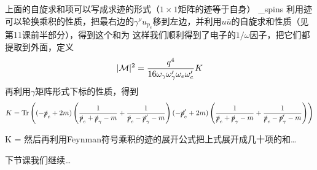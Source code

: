 \documentclass[CJK]{beamer}
\begin{document}
\begin{frame}
\bch
上面的自旋求和项可以写成求迹的形式（$1\times 1$矩阵的迹等于自身）
{\tiny
\be
\sum_{\rm spins}  
\ee
}
利用迹可以轮换乘积的性质，把最右边的$\gamma^\nu u_{p_e}$移到左边，并利用$u\bar{u}$的自旋求和性质（见第11课前半部分），得到这个和为
{\tiny
\bea
\eea
}
这样我们顺利得到了电子的$1/\omega$因子，把它们都提取到外面，定义
{\scriptsize 
$$|{\mathcal{M}}|^2 = \frac{q^4}{16 \omega_\gamma\omega_\gamma'\omega_e\omega_e'} K$$}
再利用$\gamma$矩阵形式下标的性质，得到
{\tiny
$$K =  \mathrm{Tr}\left((-\slashed{p}_e+2m) \left(\frac{1}{\slashed{p}_e+\slashed{p}_\gamma-m}+\frac{1}{\slashed{p}_e-\slashed{p}_\gamma'-m}\right)(-\slashed{p}_e'+2m)\left(\frac{1}{\slashed{p}_e+\slashed{p}_\gamma-m}+\frac{1}{\slashed{p}_e-\slashed{p}_\gamma'-m}\right)\right)$$
}

\ech
\end{frame}

\begin{frame}
\bch
{\tiny
\be
K =  \trace{}
\ee
}
然后再利用Feynman符号乘积的迹的展开公式把上式展开成几十项的和…
\ech
\end{frame}

\begin{frame}
\bch
下节课我们继续…
\ech
\end{frame}
\end{document}
